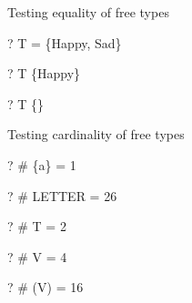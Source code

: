 \documentclass{article}
\begin{document}
Testing equality of free types
\begin{zed} \vdash?  T = \{Happy, Sad\} \end{zed}
\begin{zed} \vdash?  T \neq \{Happy\} \end{zed}
\begin{zed} \vdash?  T \neq \{\} \end{zed}


Testing cardinality of free types
\begin{zed} \vdash?  \# \{a\} = 1 \end{zed}
\begin{zed} \vdash?  \# LETTER = 26 \end{zed}
\begin{zed} \vdash?  \# T = 2 \end{zed}

\begin{zed} \vdash?  \# V = 4 \end{zed}
\begin{zed} \vdash?  \# (\power V) = 16 \end{zed}
\end{document}
